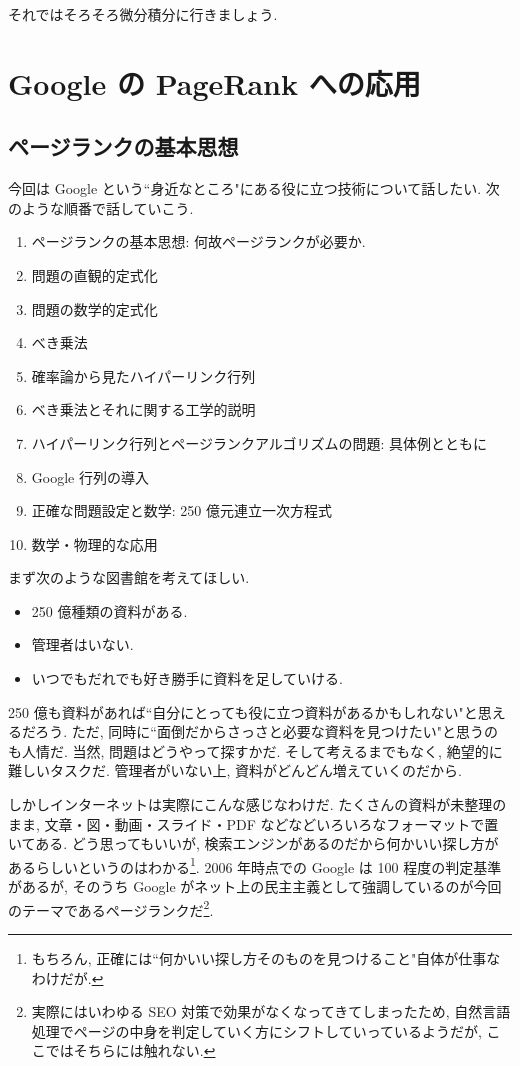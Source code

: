 \documentclass[openany, a4paper, oneside]{jsbook}
\begin{document}
それではそろそろ微分積分に行きましょう.
\chapter{Google の PageRank への応用\label{linear-algebra-google-pagerank0}}

\section{ページランクの基本思想}

今回は Google という``身近なところ"にある役に立つ技術について話したい.
次のような順番で話していこう.
\begin{enumerate}
\item ページランクの基本思想: 何故ページランクが必要か.
\item 問題の直観的定式化
\item 問題の数学的定式化
\item べき乗法
\item 確率論から見たハイパーリンク行列
\item ベき乗法とそれに関する工学的説明
\item ハイパーリンク行列とページランクアルゴリズムの問題: 具体例とともに
\item Google 行列の導入
\item 正確な問題設定と数学: 250 億元連立一次方程式
\item 数学・物理的な応用
\end{enumerate}

まず次のような図書館を考えてほしい.
\begin{itemize}
\item 250 億種類の資料がある.
\item 管理者はいない.
\item いつでもだれでも好き勝手に資料を足していける.
\end{itemize}
250 億も資料があれば``自分にとっても役に立つ資料があるかもしれない"と思えるだろう.
ただ, 同時に``面倒だからさっさと必要な資料を見つけたい"と思うのも人情だ.
当然, 問題はどうやって探すかだ.
そして考えるまでもなく, 絶望的に難しいタスクだ.
管理者がいない上, 資料がどんどん増えていくのだから.

しかしインターネットは実際にこんな感じなわけだ.
たくさんの資料が未整理のまま, 文章・図・動画・スライド・PDF などなどいろいろなフォーマットで置いてある.
どう思ってもいいが, 検索エンジンがあるのだから何かいい探し方があるらしいというのはわかる\footnote{もちろん, 正確には``何かいい探し方そのものを見つけること"自体が仕事なわけだが.}.
2006 年時点での Google は 100 程度の判定基準があるが,
そのうち Google がネット上の民主主義として強調しているのが今回のテーマであるページランクだ\footnote{実際にはいわゆる SEO 対策で効果がなくなってきてしまったため,
自然言語処理でページの中身を判定していく方にシフトしていっているようだが,
ここではそちらには触れない.}.
\end{document}
